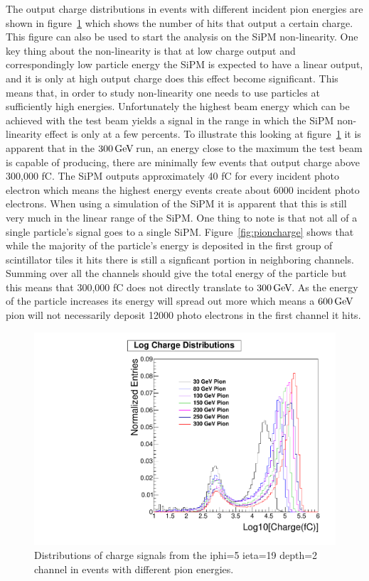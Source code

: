 The output charge distributions in events with different incident pion energies are shown in figure~\ref{fig:Log} which shows the number of hits that output a certain charge. This figure can also be used to start the analysis on the SiPM non-linearity. One key thing about the non-linearity is that at low charge output and correspondingly low particle energy the SiPM is expected to have a linear output, and it is only at high output charge does this effect become significant. This means that, in order to study non-linearity one needs to use particles at sufficiently high energies. Unfortunately the highest beam energy which can be achieved with the test beam yields a signal in the range in which the SiPM non-linearity effect is only at a few percents. To illustrate this looking at figure~\ref{fig:Log} it is apparent that in the $300{\,\text{Ge\hspace{-.08em}V\hspace{-0.16em}}}$ run, an energy close to the maximum the test beam is capable of producing, there are minimally few events that output charge above 300,000 fC. The SiPM outputs approximately 40 fC for every incident photo electron which means the highest energy events create about 6000 incident photo electrons. When using a simulation of the SiPM it is apparent that this is still very much in the linear range of the SiPM. One thing to note is that not all of a single particle's signal goes to a single SiPM. Figure~\ref{fig:pioncharge} shows that while the majority of the particle's energy is deposited in the first group of scintillator tiles it hits there is still a signficant portion in neighboring channels. Summing over all the channels should give the total energy of the particle but this means that 300,000 fC does not directly translate to $300{\,\text{Ge\hspace{-.08em}V\hspace{-0.16em}}}$. As the energy of the particle increases its energy will spread out more which means a $600{\,\text{Ge\hspace{-.08em}V\hspace{-0.16em}}}$ pion will not necessarily deposit 12000 photo electrons in the first channel it hits.

\begin{figure}
\centering
\includegraphics[width=0.7\linewidth]{Figures/Logplot.pdf}
\caption{Distributions of charge signals from the iphi=5 ieta=19 depth=2 channel in events with different pion energies.}
\label{fig:Log}
\end{figure}

